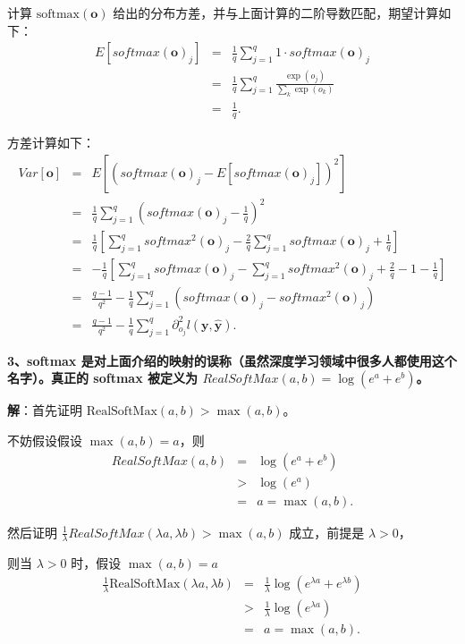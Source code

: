 \documentclass[UTF8]{ctexart}
\begin{document}
	计算 $\text{softmax}(\bm{o})$ 给出的分布方差，并与上面计算的二阶导数匹配，期望计算如下：
	\begin{eqnarray*}
		E[softmax(\bm{o})_j] &=& \frac{1}{q} \sum_{j=1}^q 1 \cdot softmax(\bm{o})_j \\
		&=& \frac{1}{q} \sum_{j=1}^q \frac{\exp(o_j)}{\sum_k \exp(o_k)} \\
		&=& \frac{1}{q}.
	\end{eqnarray*}
	
	方差计算如下：
	\begin{eqnarray*}
		Var[\bm{o}] &=& E[(softmax(\bm{o})_j - E[softmax(\bm{o})_j])^2]\\
		&=& \frac{1}{q} \sum_{j=1}^q (softmax(\bm{o})_j - \frac{1}{q})^2\\
		&=& \frac{1}{q} \left[ \sum_{j=1}^q softmax^2(\bm{o})_j - \frac{2}{q} \sum_{j=1}^q softmax(\bm{o})_j + \frac{1}{q} \right]\\
		&=& -\frac{1}{q} \left[ \sum_{j=1}^q softmax(\bm{o})_j - \sum_{j=1}^q softmax^2(\bm{o})_j + \frac{2}{q} - 1 - \frac{1}{q} \right]\\
		&=& \frac{q-1}{q^2} - \frac{1}{q} \sum_{j=1}^q (softmax(\bm{o})_j - softmax^2(\bm{o})_j)\\
		&=& \frac{q-1}{q^2} - \frac{1}{q} \sum_{j=1}^q \partial_{o_j}^2 l(\bm{y}, \hat{\bm{y}}).
	\end{eqnarray*}
	
	
	\newpage
	\textbf{3、softmax 是对上面介绍的映射的误称（虽然深度学习领域中很多人都使用这个名字）。真正的 softmax 被定义为  $RealSoftMax(a, b) = \log(e^a + e^b)$。}
	
	\noindent \textbf{解}：首先证明 $\text{RealSoftMax}(a, b) > \max(a, b)$。
	
	不妨假设假设 $\max(a, b) = a$，则
	\begin{eqnarray*}
		RealSoftMax(a, b) &=& \log(e^a + e^b) \\
		&>& \log(e^a)  \\
		&=& a =\max(a, b).
	\end{eqnarray*}
	
	然后证明 $\frac{1}{\lambda} RealSoftMax(\lambda a, \lambda b) > \max(a, b)$ 成立，前提是 $\lambda > 0$，
	
	则当 $\lambda > 0$ 时，假设 $\max(a, b) = a$
	\begin{eqnarray*}
		\frac{1}{\lambda} \text{RealSoftMax}(\lambda a, \lambda b) &=& \frac{1}{\lambda} \log(e^{\lambda a} + e^{\lambda b}) \\
		&>& \frac{1}{\lambda} \log(e^{\lambda a})  \\
		&=&a=  \max(a, b).
	\end{eqnarray*}
	
\end{document}
